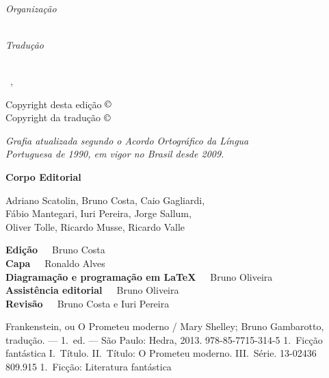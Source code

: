 \documentclass{livrodaclasse}
\begin{document}
{\centering\vspace*{10em}\thispagestyle{empty}
{\huge\titulo\par}}
\cleardoublepage
{\centering\vspace*{10em}\thispagestyle{empty}
{\huge\titulo\medskip\par}
{\Large\textls{\autor}\par}
\vspace*{8em}
{\textls{\organizador}}\\
{\small\textit{Organização}}\medskip\par
{\textls{\tradutor}}\\
{\small\textit{Tradução}}\par
\vfill\par
\logoum\\
{\normalsize\ \cidade, \ano}\par}
\clearpage

\begingroup
\parindent0mm\parskip0mm
\footnotesize
\thispagestyle{empty}

Copyright desta edição $\copyright$ \direitos\ \ano\\
Copyright da tradução $\copyright$ \tradutor\medskip

{\itshape
Grafia atualizada segundo o Acordo Ortográfico da Língua\\
Portuguesa de 1990, em vigor no Brasil desde 2009.
}\medskip

\textbf{Corpo Editorial}\smallskip

Adriano Scatolin,
Bruno Costa,
Caio Gagliardi,\\
Fábio Mantegari,
Iuri Pereira,
Jorge Sallum,\\
Oliver Tolle,
Ricardo Musse,
Ricardo Valle\medskip

\textbf{Edição}\ \ \  Bruno Costa\\
\textbf{Capa}\ \ \  Ronaldo Alves\\
\textbf{Diagramação e programação em \LaTeX}\ \ \  Bruno Oliveira\\
\textbf{Assistência editorial}\ \ \  Bruno Oliveira\\
\textbf{Revisão}\ \ \ Bruno Costa e Iuri Pereira

%
{Frankenstein, ou O Prometeu moderno / Mary Shelley; Bruno Gambarotto,
tradução. --- 1.~ed. --- São Paulo: Hedra, 2013.}%
{978-85-7715-314-5}%
{1.~Ficção fantástica I.~Título. II.~Título: O Prometeu moderno. III.~Série.}%
{13-02436}%
{809.915}%
{1.~Ficção: Literatura fantástica}
\end{document}
